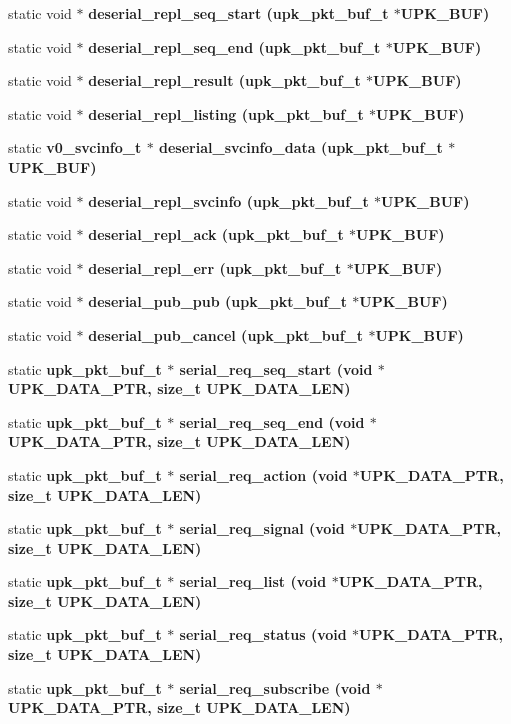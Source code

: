 \begin{CompactItemize}
static void $\ast$ \bf{deserial\_\-repl\_\-seq\_\-start} (\bf{upk\_\-pkt\_\-buf\_\-t} $\ast$UPK\_\-BUF)
\item 
static void $\ast$ \bf{deserial\_\-repl\_\-seq\_\-end} (\bf{upk\_\-pkt\_\-buf\_\-t} $\ast$UPK\_\-BUF)
\item 
static void $\ast$ \bf{deserial\_\-repl\_\-result} (\bf{upk\_\-pkt\_\-buf\_\-t} $\ast$UPK\_\-BUF)
\item 
static void $\ast$ \bf{deserial\_\-repl\_\-listing} (\bf{upk\_\-pkt\_\-buf\_\-t} $\ast$UPK\_\-BUF)
\item 
static \bf{v0\_\-svcinfo\_\-t} $\ast$ \bf{deserial\_\-svcinfo\_\-data} (\bf{upk\_\-pkt\_\-buf\_\-t} $\ast$UPK\_\-BUF)
\item 
static void $\ast$ \bf{deserial\_\-repl\_\-svcinfo} (\bf{upk\_\-pkt\_\-buf\_\-t} $\ast$UPK\_\-BUF)
\item 
static void $\ast$ \bf{deserial\_\-repl\_\-ack} (\bf{upk\_\-pkt\_\-buf\_\-t} $\ast$UPK\_\-BUF)
\item 
static void $\ast$ \bf{deserial\_\-repl\_\-err} (\bf{upk\_\-pkt\_\-buf\_\-t} $\ast$UPK\_\-BUF)
\item 
static void $\ast$ \bf{deserial\_\-pub\_\-pub} (\bf{upk\_\-pkt\_\-buf\_\-t} $\ast$UPK\_\-BUF)
\item 
static void $\ast$ \bf{deserial\_\-pub\_\-cancel} (\bf{upk\_\-pkt\_\-buf\_\-t} $\ast$UPK\_\-BUF)
\item 
static \bf{upk\_\-pkt\_\-buf\_\-t} $\ast$ \bf{serial\_\-req\_\-seq\_\-start} (void $\ast$UPK\_\-DATA\_\-PTR, size\_\-t UPK\_\-DATA\_\-LEN)
\item 
static \bf{upk\_\-pkt\_\-buf\_\-t} $\ast$ \bf{serial\_\-req\_\-seq\_\-end} (void $\ast$UPK\_\-DATA\_\-PTR, size\_\-t UPK\_\-DATA\_\-LEN)
\item 
static \bf{upk\_\-pkt\_\-buf\_\-t} $\ast$ \bf{serial\_\-req\_\-action} (void $\ast$UPK\_\-DATA\_\-PTR, size\_\-t UPK\_\-DATA\_\-LEN)
\item 
static \bf{upk\_\-pkt\_\-buf\_\-t} $\ast$ \bf{serial\_\-req\_\-signal} (void $\ast$UPK\_\-DATA\_\-PTR, size\_\-t UPK\_\-DATA\_\-LEN)
\item 
static \bf{upk\_\-pkt\_\-buf\_\-t} $\ast$ \bf{serial\_\-req\_\-list} (void $\ast$UPK\_\-DATA\_\-PTR, size\_\-t UPK\_\-DATA\_\-LEN)
\item 
static \bf{upk\_\-pkt\_\-buf\_\-t} $\ast$ \bf{serial\_\-req\_\-status} (void $\ast$UPK\_\-DATA\_\-PTR, size\_\-t UPK\_\-DATA\_\-LEN)
\item 
static \bf{upk\_\-pkt\_\-buf\_\-t} $\ast$ \bf{serial\_\-req\_\-subscribe} (void $\ast$UPK\_\-DATA\_\-PTR, size\_\-t UPK\_\-DATA\_\-LEN)

\end{CompactItemize}

